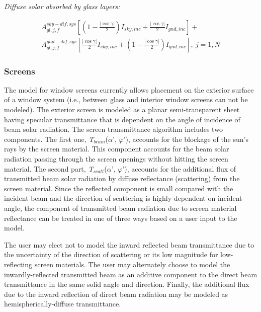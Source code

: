 \emph{Diffuse solar absorbed by glass layers:}

\begin{equation}
\begin{array}{l}A_{gl,j,f}^{sky - dif,sys}\left[ {\left( {1 - \frac{{|\cos \gamma |}}{2}} \right){I_{sky,inc}} + \frac{{|\cos \gamma |}}{2}{I_{gnd,inc}}} \right] + \\A_{gl,j,f}^{gnd - dif,sys}\left[ {\frac{{|\cos \gamma |}}{2}{I_{sky,inc}} + \left( {1 - \frac{{|\cos \gamma |}}{2}} \right){I_{gnd,inc}}} \right],{\mathrm{    }}~j = 1,N\end{array}
\end{equation}

\subsubsection{Screens}\label{screens}

The model for window screens currently allows placement on the exterior surface of a window system (i.e., between glass and interior window screens can not be modeled). The exterior screen is modeled as a planar semi-transparent sheet having specular transmittance that is dependent on the angle of incidence of beam solar radiation. The screen transmittance algorithm includes two components. The first one, \emph{T\(_{beam}\)}(\(\alpha\)', \(\varphi\)'), accounts for the blockage of the sun's rays by the screen material. This component accounts for the beam solar radiation passing through the screen openings without hitting the screen material. The second part, \emph{T\(_{scatt}\)}(\(\alpha\)', \(\varphi\)'), accounts for the additional flux of transmitted beam solar radiation by diffuse reflectance (scattering) from the screen material. Since the reflected component is small compared with the incident beam and the direction of scattering is highly dependent on incident angle, the component of transmitted beam radiation due to screen material reflectance can be treated in one of three ways based on a user input to the model.

The user may elect not to model the inward reflected beam transmittance due to the uncertainty of the direction of scattering or its low magnitude for low-reflecting screen materials. The user may alternately choose to model the inwardly-reflected transmitted beam as an additive component to the direct beam transmittance in the same solid angle and direction. Finally, the additional flux due to the inward reflection of direct beam radiation may be modeled as hemispherically-diffuse transmittance.

